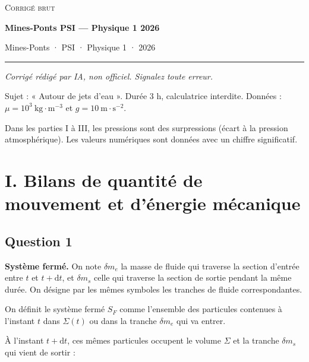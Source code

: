 \documentclass[11pt,a4paper]{article}
\newcommand{\equationajustee}[1]{%
  \sbox{\boiteequation}{$\displaystyle #1$}%
  \ifdim\wd\boiteequation>\linewidth
    \[\resizebox{\linewidth}{!}{\usebox{\boiteequation}}\]%
  \else
    \[#1\]%
  \fi}
\begin{document}
\thispagestyle{plain}
\begin{center}
  {\small\scshape Corrigé brut}\par\smallskip
  {\LARGE\bfseries Mines-Ponts PSI — Physique 1 2026\par}\medskip
  {\large Mines-Ponts · PSI · Physique 1 · 2026\par}
\end{center}
\vspace{2pt}\hrule\vspace{8pt}

\emph{Corrigé rédigé par IA, non officiel. Signalez toute erreur.}

Sujet : « Autour de jets d'eau ». Durée 3 h, calculatrice interdite. Données : \(\mu=10^3\ \mathrm{kg\cdot m^{-3}}\) et \(g=10\ \mathrm{m\cdot s^{-2}}\).

Dans les parties I à III, les pressions sont des surpressions (écart à la pression atmosphérique). Les valeurs numériques sont données avec un chiffre significatif.

\hypertarget{i.-bilans-de-quantituxe9-de-mouvement-et-duxe9nergie-muxe9canique}{%
\section{I. Bilans de quantité de mouvement et d'énergie mécanique}\label{i.-bilans-de-quantituxe9-de-mouvement-et-duxe9nergie-muxe9canique}}

\hypertarget{question-1}{%
\subsection{Question 1}\label{question-1}}

\textbf{Système fermé.} On note \(\delta m_e\) la masse de fluide qui traverse la section d'entrée entre \(t\) et \(t+\mathrm dt\), et \(\delta m_s\) celle qui traverse la section de sortie pendant la même durée. On désigne par les mêmes symboles les tranches de fluide correspondantes.

On définit le système fermé \(S_F\) comme l'ensemble des particules contenues à l'instant \(t\) dans \(\Sigma(t)\) ou dans la tranche \(\delta m_e\) qui va entrer.

À l'instant \(t+\mathrm dt\), ces mêmes particules occupent le volume \(\Sigma\) et la tranche \(\delta m_s\) qui vient de sortir :

\equationajustee{S_F(t)=\Sigma(t)\cup\delta m_e}

\equationajustee{S_F(t+\mathrm dt)=\Sigma(t+\mathrm dt)\cup\delta m_s}
\end{document}
